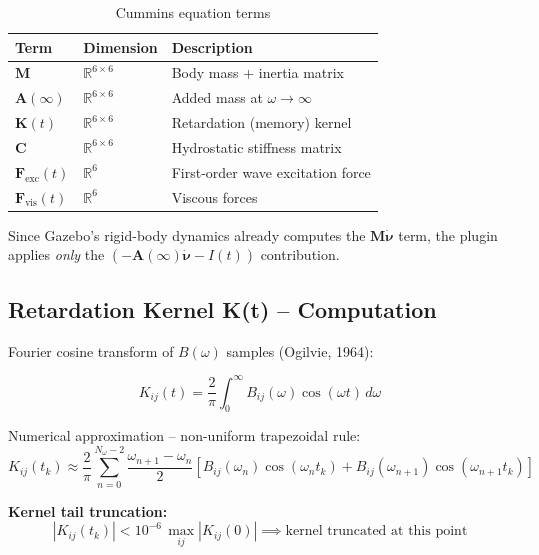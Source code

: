 \documentclass[12pt,a4paper]{article}
\newcommand{\nudot}{\dot{\boldsymbol{\nu}}}
\newcommand{\Fvec}{\mathbf{F}}
\newcommand{\Kvec}{\mathbf{K}}
\newcommand{\Cvec}{\mathbf{C}}
\newcommand{\Ainf}{\mathbf{A}(\infty)}
\begin{document}
\begin{table}[H]
  \centering
  \caption{Cummins equation terms}
  \begin{tabularx}{\linewidth}{llX}
    \toprule
    \textbf{Term} & \textbf{Dimension} & \textbf{Description} \\
    \midrule
    $\mathbf{M}$ & $\mathbb{R}^{6\times6}$ & Body mass + inertia matrix \\
    $\Ainf$ & $\mathbb{R}^{6\times6}$ & Added mass at $\omega\to\infty$ \\
    $\Kvec(t)$ & $\mathbb{R}^{6\times6}$ & Retardation (memory) kernel \\
    $\Cvec$ & $\mathbb{R}^{6\times6}$ & Hydrostatic stiffness matrix \\
    $\Fvec_{\text{exc}}(t)$ & $\mathbb{R}^6$ & First-order wave excitation force \\
    $\Fvec_{\text{vis}}(t)$ & $\mathbb{R}^6$ & Viscous forces \\
    \bottomrule
  \end{tabularx}
\end{table}

Since Gazebo's rigid-body dynamics already computes the $\mathbf{M}\nudot$
term, the plugin applies \emph{only} the $(-\Ainf\nudot - I(t))$ contribution.

\subsection{Retardation Kernel K(t) -- Computation}

Fourier cosine transform of $B(\omega)$ samples (Ogilvie, 1964):

\begin{equation}
  \boxed{
  K_{ij}(t) = \frac{2}{\pi} \int_0^\infty B_{ij}(\omega)\cos(\omega t)\,d\omega
  }
  \label{eq:kernel}
\end{equation}

Numerical approximation -- non-uniform trapezoidal rule:
\begin{equation}
  K_{ij}(t_k) \approx \frac{2}{\pi} \sum_{n=0}^{N_\omega - 2}
  \frac{\omega_{n+1}-\omega_n}{2}
  \left[B_{ij}(\omega_n)\cos(\omega_n t_k)
       + B_{ij}(\omega_{n+1})\cos(\omega_{n+1} t_k)\right]
  \label{eq:kernel_trapz}
\end{equation}

\textbf{Kernel tail truncation:}
\begin{equation}
  |K_{ij}(t_k)| < 10^{-6}\,\max_{ij}|K_{ij}(0)|
  \implies \text{kernel truncated at this point}
  \label{eq:kernel_truncation}
\end{equation}
\end{document}

